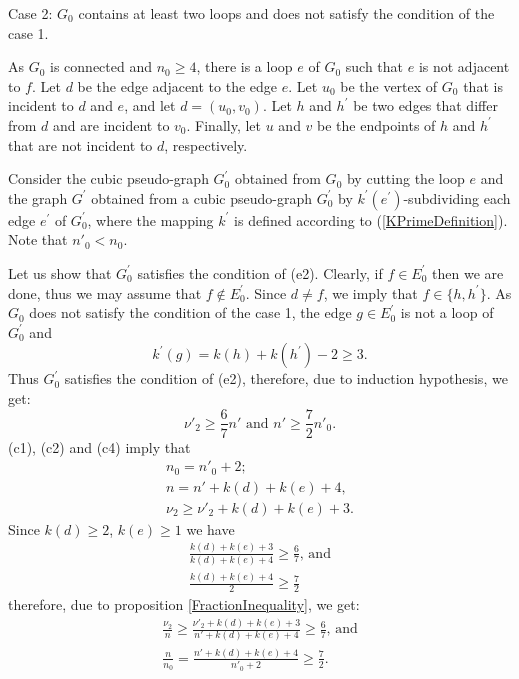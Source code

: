 \documentclass[fleqn,12pt,twoside]{article}
\newenvironment{proof}[1][Proof.]{\begin{trivlist}
\item[\hskip \labelsep {\bfseries #1}]}{\end{trivlist}}
\begin{document}
\begin{proof}
Case 2: $G_{0}$ contains at least two loops and does not satisfy the
condition of the case 1.

As $G_{0}$ is connected and $n_0\geq 4$,
there is a loop $e$ of $G_{0}$ such that $e$ is not adjacent to $f $. Let $d$ be the edge adjacent to the edge $e$. Let $u_{0}$ be
the vertex
of $G_{0}$ that is incident to $d$ and $e$, and let $d=(u_{0},v_{0})$. Let $h $ and $h^{\prime }$ be two edges that differ from $d$ and are incident to $v_{0}$. Finally, let $u$ and $v$ be the endpoints of $h$ and
$h^{\prime }$ that are not incident to $d$, respectively.

Consider the cubic pseudo-graph $G_{0}^{\prime }$ obtained from
$G_{0}$ by cutting the loop $e$ and the graph $G^{\prime }$ obtained
from a cubic pseudo-graph $G_{0}^{\prime }$ by $k^{\prime
}(e^{\prime })$-subdividing each edge $e^{\prime }$ of
$G_{0}^{\prime }$, where the mapping $k^{\prime }$ is defined
according to (\ref{KPrimeDefinition}). Note that $n'_0 < n_0$.

Let us show that $G_{0}^{\prime }$ satisfies the condition of (e2).
Clearly, if $f\in E_{0}^{\prime }$ then we are done, thus we may assume that $f\notin E_{0}^{\prime }$. Since $d\neq f$, we imply that $f\in
\{h,h^{\prime }\}$. As $G_{0}$ does not satisfy the condition of the
case 1, the edge $g\in E_{0}^{\prime }$ is not a loop of $G_{0}^{\prime }$ and
\begin{equation*}
k^{\prime }(g)=k(h)+k(h^{\prime })-2\geq 3\text{.}
\end{equation*}
Thus $G_{0}^{\prime }$ satisfies the condition of (e2), therefore,
due to induction hypothesis, we get:
\begin{equation*}
\nu' _{2}\geq \frac{6}{7}n' \text{ and }n'\geq \frac{7}{2}n'_0.
\end{equation*}(c1), (c2) and (c4) imply that\begin{gather*}
n_0=n'_0+2;
\\
n =n' +k(d)+k(e)+4\text{,} \\
\nu _{2}\geq \nu' _{2}+k(d)+k(e)+3\text{.}
\end{gather*}Since $k(d)\geq 2$, $k(e)\geq 1$ we have
\begin{gather*}
\frac{k(d)+k(e)+3}{k(d)+k(e)+4}\geq \frac{6}{7}\text{, and} \\
\frac{k(d)+k(e)+4}{2}\geq \frac{7}{2}
\end{gather*}therefore, due to proposition \ref{FractionInequality}, we get:
\begin{gather*}
\frac{\nu _{2}}{n }\geq \frac{\nu' _{2}+k(d)+k(e)+3}{n'+k(d)+k(e)+4}\geq \frac{6}{7}\text{, and} \\
\frac{n}{n_0}=\frac{n'+k(d)+k(e)+4}{n'_0+2}\geq \frac{7}{2}.
\end{gather*}


\end{proof}
\end{document}
